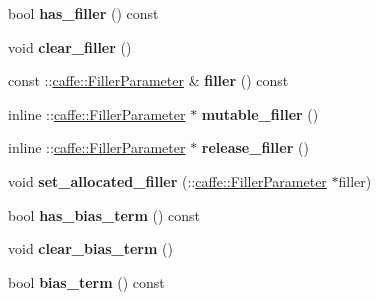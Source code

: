 \begin{DoxyCompactItemize}
bool {\bfseries has\+\_\+filler} () const
\item 
\mbox{\label{classcaffe_1_1_scale_parameter_a19ad25b47d0035f3be2a71fb9a94f21c}} 
void {\bfseries clear\+\_\+filler} ()
\item 
\mbox{\label{classcaffe_1_1_scale_parameter_a44b46987c1e41530f14ecc644dae94db}} 
const \+::\mbox{\hyperlink{classcaffe_1_1_filler_parameter}{caffe\+::\+Filler\+Parameter}} \& {\bfseries filler} () const
\item 
\mbox{\label{classcaffe_1_1_scale_parameter_a07812c035c57de69e89b065ed9714b89}} 
inline \+::\mbox{\hyperlink{classcaffe_1_1_filler_parameter}{caffe\+::\+Filler\+Parameter}} $\ast$ {\bfseries mutable\+\_\+filler} ()
\item 
\mbox{\label{classcaffe_1_1_scale_parameter_a677c34b14c90729959e7109f43ba4464}} 
inline \+::\mbox{\hyperlink{classcaffe_1_1_filler_parameter}{caffe\+::\+Filler\+Parameter}} $\ast$ {\bfseries release\+\_\+filler} ()
\item 
\mbox{\label{classcaffe_1_1_scale_parameter_a5721d9a63d4a42fb68886aa86a92b2a7}} 
void {\bfseries set\+\_\+allocated\+\_\+filler} (\+::\mbox{\hyperlink{classcaffe_1_1_filler_parameter}{caffe\+::\+Filler\+Parameter}} $\ast$filler)
\item 
\mbox{\label{classcaffe_1_1_scale_parameter_aa2173cb1346f1484fbb33cd64f5238a4}} 
bool {\bfseries has\+\_\+bias\+\_\+term} () const
\item 
\mbox{\label{classcaffe_1_1_scale_parameter_a84519f10edaa12f12040cc878c5338be}} 
void {\bfseries clear\+\_\+bias\+\_\+term} ()
\item 
\mbox{\label{classcaffe_1_1_scale_parameter_ac7911c7fd6fdd7abc8f1352fdfadc949}} 
bool {\bfseries bias\+\_\+term} () const
\item 
\mbox{\label{classcaffe_1_1_scale_parameter_a041ed2437e7ff0a569b7e0024b444875}} 

\end{DoxyCompactItemize}
